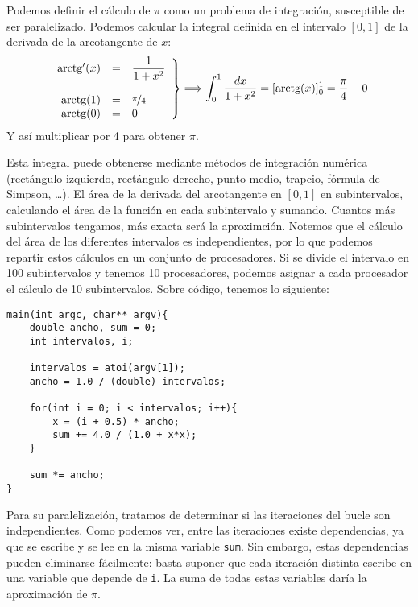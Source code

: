 Podemos definir el cálculo de $\pi$ como un problema de integración, susceptible de ser paralelizado. Podemos calcular la integral definida en el intervalo $[0,1]$ de la derivada de la arcotangente de $x$:
\begin{equation*}
    \left.\begin{array}{rcl}
        \text{arctg}'(x) & = & \dfrac{1}{1+x^2} \\
                  & & \\
        \text{arctg}(1) & = & \nicefrac{\pi}{4} \\
        \text{arctg}(0) & = & 0 
    \end{array}\right\} \Longrightarrow \int_{0}^{1} \dfrac{dx}{1+x^2} = [\text{arctg}(x)]_0^1 = \dfrac{\pi}{4} - 0
\end{equation*}
Y así multiplicar por 4 para obtener $\pi$.

Esta integral puede obtenerse mediante métodos de integración numérica (rectángulo izquierdo, rectángulo derecho, punto medio, trapcio, fórmula de Simpson, \ldots). El área de la derivada del arcotangente en $[0,1]$ en subintervalos, calculando el área de la función en cada subintervalo y sumando. Cuantos más subintervalos tengamos, más exacta será la aproximción.
Notemos que el cálculo del área de los diferentes intervalos es independientes, por lo que podemos repartir estos cálculos en un conjunto de procesadores. Si se divide el intervalo en 100 subintervalos y tenemos 10 procesadores, podemos asignar a cada procesador el cálculo de 10 subintervalos. Sobre código, tenemos lo siguiente:
    \begin{verbatim}
main(int argc, char** argv){
    double ancho, sum = 0;
    int intervalos, i;

    intervalos = atoi(argv[1]);
    ancho = 1.0 / (double) intervalos;

    for(int i = 0; i < intervalos; i++){
        x = (i + 0.5) * ancho;
        sum += 4.0 / (1.0 + x*x);
    }

    sum *= ancho;
}
    \end{verbatim}
Para su paralelización, tratamos de determinar si las iteraciones del bucle son independientes. Como podemos ver, entre las iteraciones existe dependencias, ya que se escribe y se lee en la misma variable \verb|sum|. Sin embargo, estas dependencias pueden eliminarse fácilmente: basta suponer que cada iteración distinta escribe en una variable que depende de \verb|i|. La suma de todas estas variables daría la aproximación de $\pi$. 

